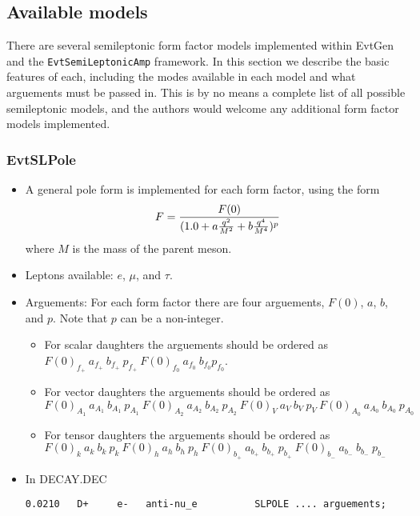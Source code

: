 \subsection{Available models}
\label{sec:models}
\noindent There are several semileptonic form factor models
implemented within EvtGen and the {\tt EvtSemiLeptonicAmp} 
framework.  In this section we describe the basic features of
each, including the modes available in each model and what
arguements must be passed in.  This is by no means a complete
list of all possible semileptonic models, and the authors would
welcome any additional form factor models implemented.

\subsubsection{EvtSLPole}
\label{sect:EvtSLPole}
\begin{itemize} 
\item A general pole form is implemented for each form factor, using
the form
\begin{equation}
F = { {F(0)} \over { (1.0 + a { {q^2} \over {M^2} } + b { {q^4} \over {M^4} })^p}}
\end{equation}
where $M$ is the mass of the parent meson. 
\item Leptons available: $e$, $\mu$, and $\tau$.
\item Arguements: For each form factor there are four arguements, $F(0)$,
$a$, $b$, and $p$.  Note that $p$ can be a non-integer.  
\begin{itemize}
\item For scalar daughters the arguements should be ordered
as \\
$F(0)_{f_+}~ a_{f_+}~ b_{f_+}~ p_{f_+}~ F(0)_{f_0}~ a_{f_0}~ b_{f_0}p_{f_0}$.
\item For vector daughters the arguements should be ordered
as \\
$F(0)_{A_1}~ a_{A_1}~ b_{A_1}~p_{A_1}~F(0)_{A_2}~ a_{A_2}~ b_{A_2}~p_{A_2}~
F(0)_{V}~ a_{V}~ b_{V}~ p_{V}~
F(0)_{A_0}~ a_{A_0}~ b_{A_0}~p_{A_0}$
\item For tensor daughters the arguements should be ordered
as  \\ 
$F(0)_{k}~ a_{k}~ b_{k}~p_{k}~F(0)_{h}~ a_{h}~ b_{h}~p_{h}~F(0)_{b_+}~ a_{b_+}~ b_{b_+}~
p_{b_+}~F(0)_{b_-}~ a_{b_-}~ b_{b_-}~p_{b_-}$
\end{itemize}
\item In DECAY.DEC
\begin{verbatim}
0.0210   D+     e-   anti-nu_e          SLPOLE .... arguements;
\end{verbatim}
\end{itemize}

